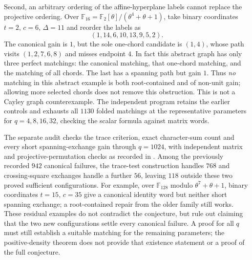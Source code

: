 \documentclass[11pt,a4paper]{article}
\theoremstyle{definition}
\theoremstyle{remark}
\begin{document}
Second, an arbitrary ordering of the affine-hyperplane labels cannot replace the projective ordering.  Over $\mathbb F_{16}=\mathbb F_2[\theta]/(\theta^4+\theta+1)$, take binary coordinates $t=2$, $c=6$, $\Delta=11$ and reorder the labels as
\[
                  (1,14,6,10,13,9,5,2).
\]
The canonical gain is $1$, but the sole one-chord candidate is $(1,4)$, whose path visits $(1,2,7,6,8)$ and misses endpoint $4$.  In fact this abstract graph has only three perfect matchings: the canonical matching, that one-chord matching, and the matching of all chords.  The last has a spanning path but gain $1$.  Thus \emph{no} matching in this abstract example is both root-contained and of non-unit gain; allowing more selected chords does not remove this obstruction.  This is not a Cayley graph counterexample.  The independent program  retains the earlier controls and exhausts all $1130$ folded matchings at the representative parameters for $q=4,8,16,32$, checking the scalar formula against matrix words.

The separate audit  checks the trace criterion, exact character-sum count and every short spanning-exchange gain through $q=1024$, with independent matrix and projective-permutation checks as recorded in .  Among the previously recorded $942$ canonical failures, the trace-test construction handles $768$ and crossing-square exchanges handle a further $56$, leaving $118$ outside these two proved sufficient configurations.  For example, over $\mathbb F_{128}$ modulo $\theta^7+\theta+1$, binary coordinates $t=15$, $c=35$ give a canonical identity word but neither short spanning exchange; a root-contained repair from the older family still works.  These residual examples do not contradict the conjecture, but rule out claiming that the two new configurations settle every canonical failure.  A proof for all $q$ must still establish a suitable matching for the remaining parameters; the positive-density theorem does not provide that existence statement or a proof of the full conjecture.
\end{document}
